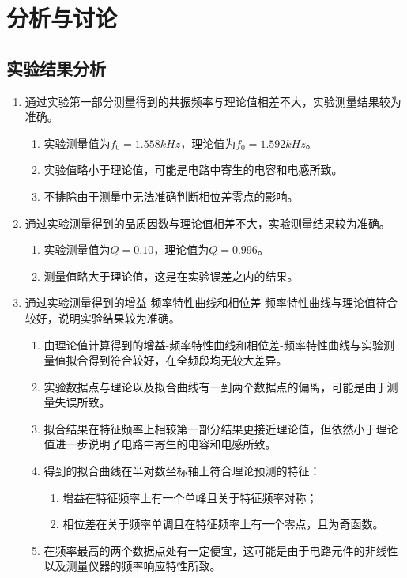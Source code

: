 \documentclass[UTF8]{ctexart}
\begin{document}
\section{分析与讨论}
\subsection{实验结果分析}
\begin{enumerate}
    \item 通过实验第一部分测量得到的共振频率与理论值相差不大，实验测量结果较为准确。
    \begin{enumerate}
        \item 实验测量值为$f_0=1.558kHz$，理论值为$f_0=1.592kHz$。
        \item 实验值略小于理论值，可能是电路中寄生的电容和电感所致。
        \item 不排除由于测量中无法准确判断相位差零点的影响。
    \end{enumerate} 
    \item 通过实验测量得到的品质因数与理论值相差不大，实验测量结果较为准确。
    \begin{enumerate}
        \item 实验测量值为$Q=0.10$，理论值为$Q=0.996$。
        \item 测量值略大于理论值，这是在实验误差之内的结果。
    \end{enumerate}
    \item 通过实验测量得到的增益-频率特性曲线和相位差-频率特性曲线与理论值符合较好，说明实验结果较为准确。
    \begin{enumerate}
        \item 由理论值计算得到的增益-频率特性曲线和相位差-频率特性曲线与实验测量值拟合得到符合较好，在全频段均无较大差异。
        \item 实验数据点与理论以及拟合曲线有一到两个数据点的偏离，可能是由于测量失误所致。
        \item 拟合结果在特征频率上相较第一部分结果更接近理论值，但依然小于理论值进一步说明了电路中寄生的电容和电感所致。
        \item 得到的拟合曲线在半对数坐标轴上符合理论预测的特征：
        \begin{enumerate}
            \item 增益在特征频率上有一个单峰且关于特征频率对称；
            \item 相位差在关于频率单调且在特征频率上有一个零点，且为奇函数。
        \end{enumerate}
        \item 在频率最高的两个数据点处有一定便宜，这可能是由于电路元件的非线性以及测量仪器的频率响应特性所致。
    \end{enumerate}
\end{enumerate}
\end{document}

